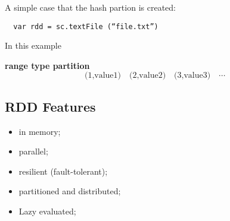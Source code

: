 \documentclass[notheorems, aspectratio=54]{beamer}
\begin{document}
\begin{frame}[fragile]

  A simple case that the hash partion is created:
  \begin{verbatim}
  var rdd = sc.textFile (“file.txt”)   
  \end{verbatim}
  In this example 

\end{frame}

\begin{frame}

  \begin{block}{\textbf{range type partition}}
 \begin{displaymath}
  \text{(1,value1)}  \quad \text{(2,value2)} \quad \text{(3,value3)}  \quad \cdots
 \end{displaymath}
\end{block}

  
\end{frame}

\subsection{RDD Features}
\begin{frame}

\begin{itemize}
 \item in memory;
 \item parallel;
 \item resilient (fault-tolerant);
 \item partitioned and distributed;
 \item Lazy evaluated;
\end{itemize} 
  
\end{frame}
\end{document}

